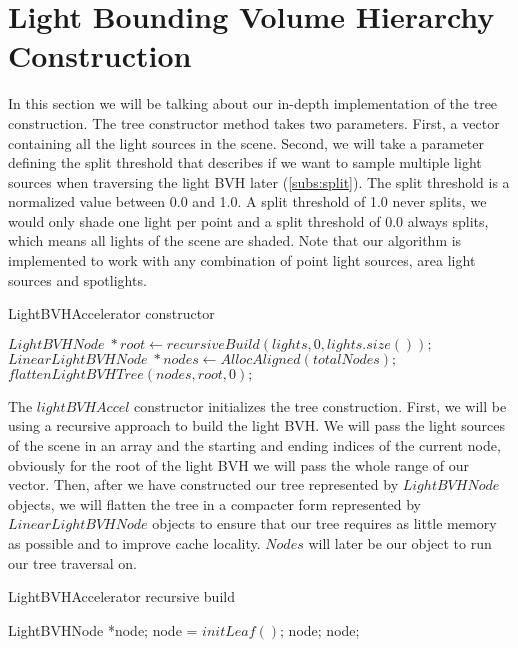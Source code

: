 \section{Light Bounding Volume Hierarchy Construction}
\label{sec:alg:con}

In this section we will be talking about our in-depth implementation of the tree construction. The tree constructor method takes two parameters. First, a vector containing all the light sources in the scene. Second, we will take a parameter defining the split threshold that describes if we want to sample multiple light sources when traversing the light BVH later (\ref{subs:split}). The split threshold is a normalized value between 0.0 and 1.0. A split threshold of 1.0 never splits, we would only shade one light per point and a split threshold of 0.0 always splits, which means all lights of the scene are shaded. Note that our algorithm is implemented to work with any combination of point light sources, area light sources and spotlights.

\begin{algorithm}
	\caption{LightBVHAccelerator constructor}
	\label{LightBVHAccelerator}
	\begin{algorithmic}[1] %
		\State $LightBVHNode \; *root  \gets recursiveBuild(lights, 0, lights.size());$
		\State $LinearLightBVHNode \; *nodes \gets AllocAligned(totalNodes);$ 
		\State $flattenLightBVHTree(nodes, root, 0);$
		\EndProcedure
	\end{algorithmic}
\end{algorithm}

The $lightBVHAccel$ constructor initializes the tree construction. First, we will be using a recursive approach to build the light BVH. We will pass the light sources of the scene in an array and the starting and ending indices of the current node, obviously for the root of the light BVH we will pass the whole range of our vector. Then, after we have constructed our tree represented by $LightBVHNode$ objects, we will flatten the tree in a compacter form represented by $LinearLightBVHNode$ objects to ensure that our tree requires as little memory as possible and to improve cache locality. $Nodes$ will later be our object to run our tree traversal on.

\begin{algorithm}
	\caption{LightBVHAccelerator recursive build}
	\label{recursiveBuild}
	\begin{algorithmic}[1] %
		\State LightBVHNode *node;
			\State *node = $initLeaf()$;
			\State \Return node;
		\EndIf
        	\State <calculate axis and thetas for the whole node for current dimension>
			\State <calculate all split costs for current dimension>
		\EndFor
		\State <find out best split>
		\State <initialize child nodes and make reference as children>
		\State \Return node;
		\EndProcedure
	\end{algorithmic}
\end{algorithm}

